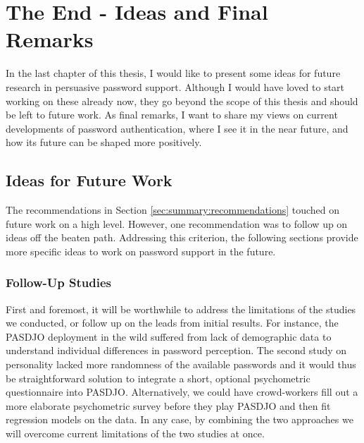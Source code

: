 \chapter[The End - Ideas and Final Remarks]{The End - Ideas and Final Remarks}\label{chap:the_end}
In the last chapter of this thesis, I would like to present some ideas for future research in persuasive password support. Although I would have loved to start working on these already now, they go beyond the scope of this thesis and should be left to future work. As final remarks, I want to share my views on current developments of password authentication, where I see it in the near future, and how its future can be shaped more positively. 

\section{Ideas for Future Work}
The recommendations in Section \ref{sec:summary:recommendations} touched on future work on a high level. However, one recommendation was to follow up on ideas off the beaten path. Addressing this criterion, the following sections provide more specific ideas to work on password support in the future. 


\subsection{Follow-Up Studies} 
First and foremost, it will be worthwhile to address the limitations of the studies we conducted, or follow up on the leads from initial results. For instance, the PASDJO deployment in the wild suffered from lack of demographic data to understand individual differences in password perception. The second study on personality lacked more randomness of the available passwords and it would thus be straightforward solution to integrate a short, optional psychometric questionnaire into PASDJO. Alternatively, we could have crowd-workers fill out a more elaborate psychometric survey before they play PASDJO and then fit regression models on the data. In any case, by combining the two approaches we will overcome current limitations of the two studies at once. 

